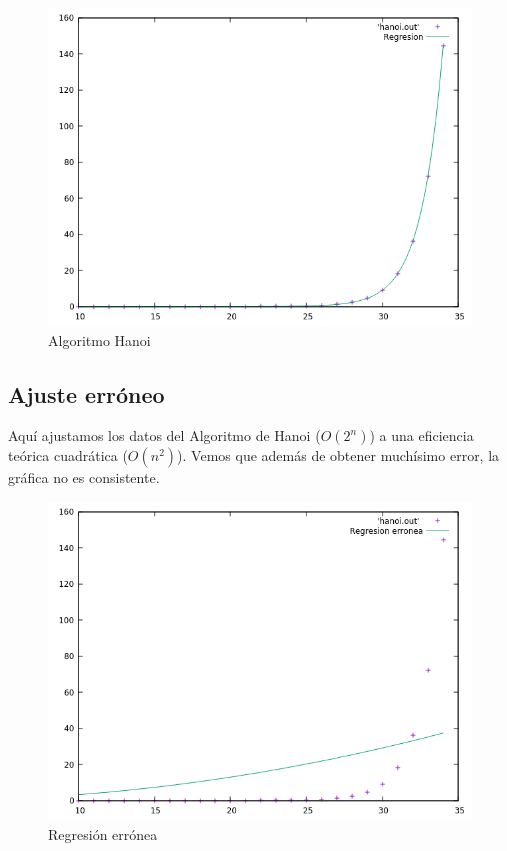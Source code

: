 \documentclass[12pt,spanish]{article}
\begin{document}
\begin{figure}[H]
\centering
\includegraphics[scale=0.75]{hibrida_hanoi.png}
\caption{Algoritmo Hanoi}
\end{figure}

\newpage

\subsection{Ajuste erróneo}
Aquí ajustamos los datos del Algoritmo de Hanoi ($O(2^n)$) a una eficiencia teórica cuadrática ($O(n^2)$). Vemos que además de obtener muchísimo error, la gráfica no es consistente.

\begin{figure}[H]
\centering
\includegraphics[scale=0.75]{ajuste_erroneo.png}
\caption{Regresión errónea}
\end{figure}
\newpage
\end{document}

